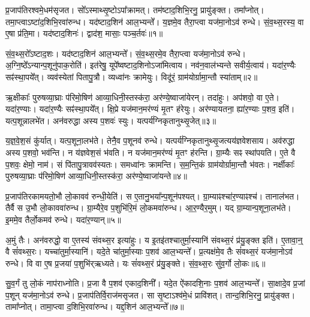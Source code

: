 प्र॒जा\-प॑तिरश्वमे॒धम॑\-सृजत।
सो᳚ऽस्माथ्सृ॒ष्टो\-ऽपा᳚क्रामत्।
तम॑ष्टा\-द॒शिभि॒\-रनु॒\- प्रायु॑ङ्क्त।
तमा᳚प्नोत्।
तमा॒प्त्वा\-ऽष्टा॑द॒शिभि॒रवा॑\-रुन्ध।
यद॑ष्टा\-द॒शिन॑ आल॒भ्यन्ते᳚।
य॒ज्ञमे॒व तैरा॒प्त्वा यज॑मा॒नो\-ऽव॑ रुन्धे।
सं॒व॒थ्स॒\-र\-स्य॒ वा ए॒षा प्र॑ति॒मा।
यद॑ष्टाद॒शिनः॑।
द्वाद॑श॒ मासाः॒ पञ्च॒र्तवः॑॥१॥

सं॒व॒थ्स॒रो᳚\-ऽष्टाद॒शः।
यद॑ष्टाद॒शिन॑ आल॒भ्यन्ते᳚।
सं॒व॒थ्स॒रमे॒व तैरा॒प्त्वा यज॑मा॒नो\-ऽव॑ रुन्धे।
अ॒ग्नि॒ष्ठे᳚\-ऽन्यान्प॒शूनु॑पाक॒रोति॑।
इत॑रेषु॒ यूपे᳚ष्वष्टाद॒शिनो\-ऽजा॑मित्वाय।
नव॑न॒वाल॑भ्यन्ते सवीर्य॒त्वाय॑।
यदा॑र॒ण्यैः सꣴ॑स्था॒पये᳚त्।
व्यव॑स्येतां पितापु॒त्रौ।
व्यध्वा॑नः क्रामेयुः।
विदू॑रं॒ ग्राम॑योर्ग्रामा॒न्तौ स्या॑ताम्॥२॥

ऋ॒क्षीकाः᳚ पुरुषव्या॒घ्राः प॑रिमो॒षिण॑ आव्या॒धिनी॒स्तस्क॑रा॒ अर॑ण्ये॒ष्वाजा॑येरन्।
तदा॑हुः।
अप॑शवो॒ वा ए॒ते।
यदा॑र॒ण्याः।
यदा॑र॒ण्यैः सꣴ॑स्था॒पये᳚त्।
क्षि॒प्रे यज॑मान॒मर॑ण्यं मृ॒तꣳ ह॑रेयुः।
अर॑ण्यायतना॒ ह्या॑र॒ण्याः प॒शव॒ इति॑।
यत्प॒शून्नालभे॑त।
अन॑वरुद्धा अस्य प॒शवः॑ स्युः।
यत्पर्य॑ग्निकृतानुथ्सृ॒जेत्॥३॥

य॒ज्ञ॒वे॒श॒सं कु॑र्यात्।
यत्प॒शूना॒लभ॑ते।
तेनै॒व प॒शूनव॑ रुन्धे।
यत्पर्य॑ग्निकृतानुथ्सृ॒जत्यय॑ज्ञवेशसाय।
अव॑रुद्धा अस्य प॒शवो॒ भव॑न्ति।
न य॑ज्ञवेश॒सं भ॑वति।
न यज॑मान॒मर॑ण्यं मृ॒तꣳ ह॑रन्ति।
ग्रा॒म्यैः सꣴ स्था॑पयति।
ए॒ते वै प॒शवः॒ क्षेमो॒ नाम॑।
सं पि॑तापु॒त्रावव॑स्यतः।
समध्वा॑नः क्रामन्ति।
स॒म॒न्ति॒कं ग्राम॑योर्ग्रामा॒न्तौ भ॑वतः।
नर्क्षीकाः᳚ पुरुषव्या॒घ्राः प॑रिमो॒षिण॑ आव्या॒धिनी॒स्तस्क॑रा॒ अर॑ण्ये॒ष्वाजा॑यन्ते॥४॥\anuvakamend[ऋ॒तवः॑ स्यातामुथ्सृ॒जेथ्स्य॑त॒स्त्रीणि॑ च]

प्र॒जा\-प॑तिरकामयतो॒भौ लो॒कावव॑ रुन्धी॒येति॑।
स ए॒ता\-नु॒भया᳚न्प॒शून॑\-पश्यत्।
ग्रा॒म्याꣴश्चा॑र॒ण्याꣴश्च॑।
तानाल॑भत।
तैर्वै स उ॒भौ लो॒का\-ववा॑\-रुन्ध।
ग्रा॒म्यैरे॒व प॒शुभि॑रि॒मं लो॒कमवा॑रुन्ध।
आ॒र॒ण्यै\-र॒मुम्।
यद् ग्रा॒म्यान्प॒शूना॒लभ॑ते।
इ॒ममे॒व तैर्लो॒कमव॑ रुन्धे।
यदा॑र॒ण्यान्॥५॥

अ॒मुं तैः।
अन॑वरुद्धो॒ वा ए॒तस्य॑ संवथ्स॒र इत्या॑हुः।
य इ॒तइ॑तश्चातुर्मा॒स्यानि॑ संवथ्स॒रं प्र॑यु॒ङ्क्त इति॑।
ए॒तावा॒न्॒ वै सं॑वथ्स॒रः।
यच्चा॑तुर्मा॒स्यानि॑।
यदे॒ते चा॑तुर्मा॒स्याः प॒शव॑ आल॒भ्यन्ते᳚।
प्र॒त्यक्ष॑मे॒व तैः सं॑वथ्स॒रं यज॑मा॒नो\-ऽव॑ रुन्धे।
वि वा ए॒ष प्र॒जया॑ प॒शुभि॑र्‌\mbox{}ऋध्यते।
यः सं॑वथ्स॒रं प्र॑यु॒ङ्क्ते।
सं॒व॒थ्स॒रः सु॑व॒र्गो लो॒कः॥६॥

सु॒व॒र्गं तु लो॒कं नाप॑राध्नोति।
प्र॒जा वै प॒शव॑ एकाद॒शिनी᳚।
यदे॒त ऐ॑कादशि॒नाः प॒शव॑ आल॒भ्यन्ते᳚।
सा॒क्षादे॒व प्र॒जां प॒शून् यज॑मा॒नो\-ऽव॑ रुन्धे।
प्र॒जा\-प॑तिर्वि॒राज॑म\-सृजत।
सा सृ॒ष्टा\-ऽश्व॑मे॒धं प्रावि॑शत्।
तान्द॒शिभि॒रनु॒\- प्रायु॑ङ्क्त।
तामा᳚प्नोत्।
तामा॒प्त्वा द॒शिभि॒रवा॑रुन्ध।
यद्द॒शिन॑ आल॒भ्यन्ते᳚॥७॥

